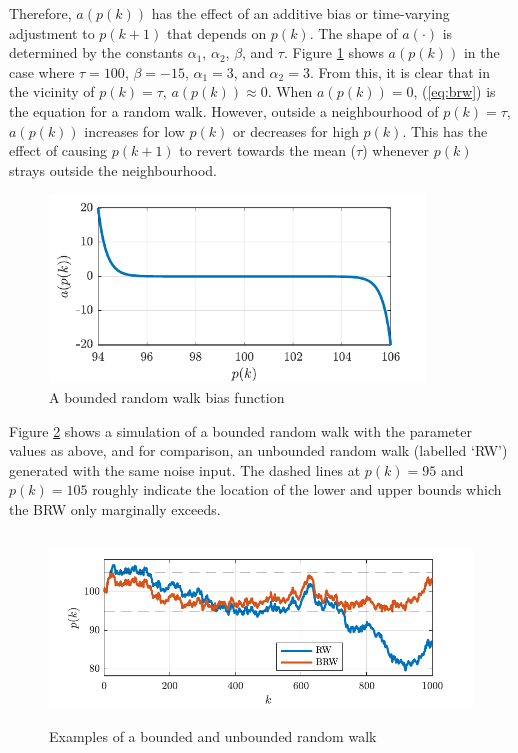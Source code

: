 Therefore, $a(p(k))$ has the effect of an additive bias or time-varying adjustment to $p(k+1)$ that depends on $p(k)$. The shape of $a(\cdot)$ is determined by the constants $\alpha_{1}$,  $\alpha_{2}$, $\beta$, and $\tau$. Figure \ref{fig:brw-a} shows $a(p(k))$ in the case where $\tau=100$, $\beta=-15$, $\alpha_{1}=3$, and $\alpha_{2}=3$.  From this, it is clear that in the vicinity of $p(k)=\tau$, $a(p(k))\approx0$. When $a(p(k))=0$, (\ref{eq:brw}) is the equation for a random walk. However, outside a neighbourhood of $p(k)=\tau$, $a(p(k))$ increases for low $p(k)$ or decreases for high $p(k)$. This has the effect of causing $p(k+1)$ to revert towards the mean ($\tau$) whenever $p(k)$ strays outside the neighbourhood. 

\begin{figure}[htp]
	\centering
	\includegraphics[height=5cm]{images/brw_a.pdf}
	\caption{A bounded random walk bias function}
	\label{fig:brw-a}
\end{figure}

Figure \ref{fig:brw-sim} shows a simulation of a bounded random walk with the parameter values as above, and for comparison, an unbounded random walk (labelled `RW') generated with the same noise input. The dashed lines at $p(k)=95$ and $p(k)=105$ roughly indicate the location of the lower and upper bounds which the BRW only marginally exceeds.

\begin{figure}[htp]
	\centering
	\includegraphics[height=5cm]{images/brw_sim.pdf}
	\caption{Examples of a bounded and unbounded random walk}
	\label{fig:brw-sim}
\end{figure}

